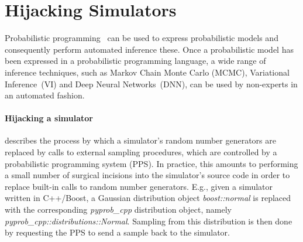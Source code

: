 \documentclass{article}
\begin{document}





\section{Hijacking Simulators}
\label{sec:hijackingsimulators}

 Probabilistic programming~\cite{gordon2014probabilistic,staton2016semantics,kozen1979semantics} 
can be used to express probabilistic models and consequently perform automated inference these. Once a probabilistic model has been expressed in a probabilistic programming language, a wide range of inference techniques, such as Markov Chain Monte Carlo (MCMC)\cite{}, Variational Inference~(VI)\cite{} and Deep Neural Networks~(DNN)\cite{},  can be used by non-experts in an automated fashion. 
 
\paragraph{Hijacking a simulator} describes the process by which a simulator's random number generators are replaced by calls to external sampling procedures, which are controlled by a probabilistic programming system (PPS). In practice, this amounts to performing a small number of surgical incisions into the simulator's source code in order to replace built-in calls to random number generators. E.g., given a simulator written in C++/Boost\cite{schaling2011boost}, a Gaussian distribution object \textit{boost::normal} is replaced with the corresponding \textit{pyprob\_cpp} distribution object, namely \textit{pyprob\_cpp::distributions::Normal}. Sampling from this distribution is then done by requesting the PPS to send a sample back to the simulator.
\end{document}
